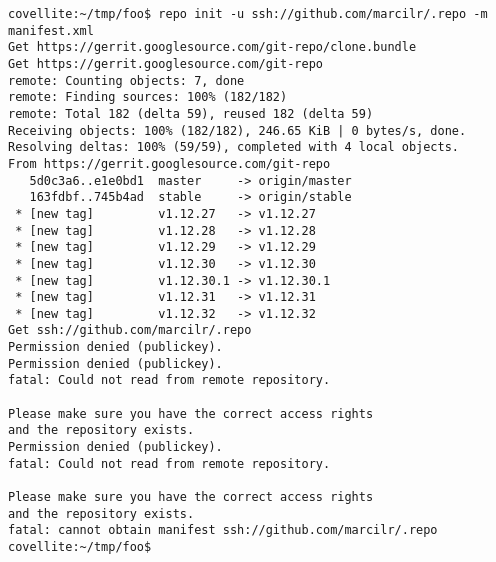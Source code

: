 \begin{verbatim}
covellite:~/tmp/foo$ repo init -u ssh://github.com/marcilr/.repo -m manifest.xml
Get https://gerrit.googlesource.com/git-repo/clone.bundle
Get https://gerrit.googlesource.com/git-repo
remote: Counting objects: 7, done
remote: Finding sources: 100% (182/182)
remote: Total 182 (delta 59), reused 182 (delta 59)
Receiving objects: 100% (182/182), 246.65 KiB | 0 bytes/s, done.
Resolving deltas: 100% (59/59), completed with 4 local objects.
From https://gerrit.googlesource.com/git-repo
   5d0c3a6..e1e0bd1  master     -> origin/master
   163fdbf..745b4ad  stable     -> origin/stable
 * [new tag]         v1.12.27   -> v1.12.27
 * [new tag]         v1.12.28   -> v1.12.28
 * [new tag]         v1.12.29   -> v1.12.29
 * [new tag]         v1.12.30   -> v1.12.30
 * [new tag]         v1.12.30.1 -> v1.12.30.1
 * [new tag]         v1.12.31   -> v1.12.31
 * [new tag]         v1.12.32   -> v1.12.32
Get ssh://github.com/marcilr/.repo
Permission denied (publickey).
Permission denied (publickey).
fatal: Could not read from remote repository.

Please make sure you have the correct access rights
and the repository exists.
Permission denied (publickey).
fatal: Could not read from remote repository.

Please make sure you have the correct access rights
and the repository exists.
fatal: cannot obtain manifest ssh://github.com/marcilr/.repo
covellite:~/tmp/foo$
\end{verbatim}